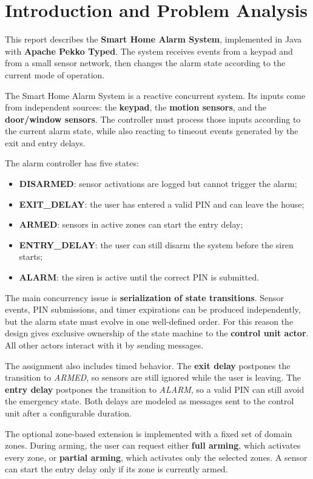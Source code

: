 \section{Introduction and Problem Analysis}

This report describes the \textbf{Smart Home Alarm System}, implemented in Java with \textbf{Apache Pekko Typed}.
The system receives events from a keypad and from a small sensor network, then changes the alarm state according to the
current mode of operation.

The Smart Home Alarm System is a reactive concurrent system.
Its inputs come from independent sources: the \textbf{keypad}, the \textbf{motion sensors}, and the
\textbf{door/window sensors}.
The controller must process those inputs according to the current alarm state, while also reacting to timeout events
generated by the exit and entry delays.

The alarm controller has five states:
\begin{itemize}
    \item \textbf{DISARMED}: sensor activations are logged but cannot trigger the alarm;
    \item \textbf{EXIT\_DELAY}: the user has entered a valid PIN and can leave the house;
    \item \textbf{ARMED}: sensors in active zones can start the entry delay;
    \item \textbf{ENTRY\_DELAY}: the user can still disarm the system before the siren starts;
    \item \textbf{ALARM}: the siren is active until the correct PIN is submitted.
\end{itemize}

The main concurrency issue is \textbf{serialization of state transitions}.
Sensor events, PIN submissions, and timer expirations can be produced independently, but the alarm state must evolve in
one well-defined order.
For this reason the design gives exclusive ownership of the state machine to the \textbf{control unit actor}.
All other actors interact with it by sending messages.

The assignment also includes timed behavior.
The \textbf{exit delay} postpones the transition to \textit{ARMED}, so sensors are still ignored while the user is leaving.
The \textbf{entry delay} postpones the transition to \textit{ALARM}, so a valid PIN can still avoid the emergency state.
Both delays are modeled as messages sent to the control unit after a configurable duration.

The optional zone-based extension is implemented with a fixed set of domain zones.
During arming, the user can request either \textbf{full arming}, which activates every zone, or \textbf{partial arming},
which activates only the selected zones.
A sensor can start the entry delay only if its zone is currently armed.
